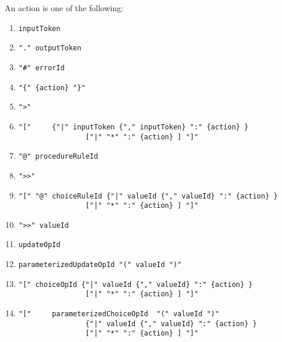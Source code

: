 An action is one of the following:
\begin{enumerate}
\item 
\begin{verbatim}
inputToken
\end{verbatim}
\item 
\begin{verbatim}
"." outputToken
\end{verbatim}
\item 
\begin{verbatim}
"#" errorId
\end{verbatim}
\item 
\begin{verbatim}
"{" {action} "}"
\end{verbatim}
\item 
\begin{verbatim}
">"
\end{verbatim}
\item 
\begin{verbatim}
"["     {"|" inputToken {"," inputToken} ":" {action} }
                ["|" "*" ":" {action} ] "]" 
\end{verbatim}
\item 
\begin{verbatim}
"@" procedureRuleId
\end{verbatim}
\item 
\begin{verbatim}
">>"
\end{verbatim}
             
\item 
\begin{verbatim}
"[" "@" choiceRuleId {"|" valueId {"," valueId} ":" {action} }
                ["|" "*" ":" {action} ] "]" 
\end{verbatim}
\item 
\begin{verbatim}
">>" valueId
\end{verbatim}
\item 
\begin{verbatim}
updateOpId
\end{verbatim}
\item 
\begin{verbatim}
parameterizedUpdateOpId "(" valueId ")"
\end{verbatim}
\item 
\begin{verbatim}
"[" choiceOpId {"|" valueId {"," valueId} ":" {action} }
                ["|" "*" ":" {action} ] "]"
\end{verbatim}
\item 
\begin{verbatim}
"["     parameterizedChoiceOpId  "(" valueId ")"
                {"|" valueId {"," valueId} ":" {action} }
                ["|" "*" ":" {action} ] "]"
\end{verbatim}
\end{enumerate}

